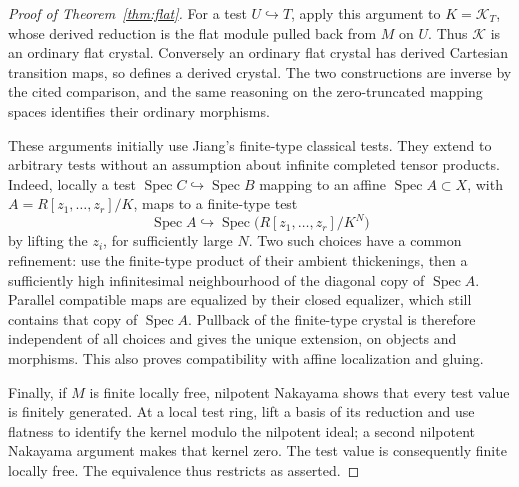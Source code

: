 \documentclass[11pt]{article}
\DeclareMathOperator{\Spec}{Spec}\DeclareMathOperator{\Hom}{Hom}
\theoremstyle{definition}\newtheorem{definition}[theorem]{Definition}
\theoremstyle{remark}\newtheorem{remark}[theorem]{Remark}
\begin{document}
\begin{proof}[Proof of Theorem~\ref{thm:flat}]
For a test $U\hookrightarrow T$, apply this argument to $K=\mathcal K_T$, whose derived reduction is the flat module pulled back from $M$ on $U$.  Thus $\mathcal K$ is an ordinary flat crystal.  Conversely an ordinary flat crystal has derived Cartesian transition maps, so defines a derived crystal.  The two constructions are inverse by the cited comparison, and the same reasoning on the zero-truncated mapping spaces identifies their ordinary morphisms.

These arguments initially use Jiang's finite-type classical tests.  They extend to arbitrary tests without an assumption about infinite completed tensor products.  Indeed, locally a test $\Spec C\hookrightarrow\Spec B$ mapping to an affine $\Spec A\subset X$, with $A=R[z_1,\ldots,z_r]/K$, maps to a finite-type test
\[
 \Spec A\hookrightarrow\Spec\bigl(R[z_1,\ldots,z_r]/K^N\bigr)
\]
by lifting the $z_i$, for sufficiently large $N$.  Two such choices have a common refinement: use the finite-type product of their ambient thickenings, then a sufficiently high infinitesimal neighbourhood of the diagonal copy of $\Spec A$.  Parallel compatible maps are equalized by their closed equalizer, which still contains that copy of $\Spec A$.  Pullback of the finite-type crystal is therefore independent of all choices and gives the unique extension, on objects and morphisms.  This also proves compatibility with affine localization and gluing.

Finally, if $M$ is finite locally free, nilpotent Nakayama shows that every test value is finitely generated.  At a local test ring, lift a basis of its reduction and use flatness to identify the kernel modulo the nilpotent ideal; a second nilpotent Nakayama argument makes that kernel zero.  The test value is consequently finite locally free.  The equivalence thus restricts as asserted.
\end{proof}
\end{document}
